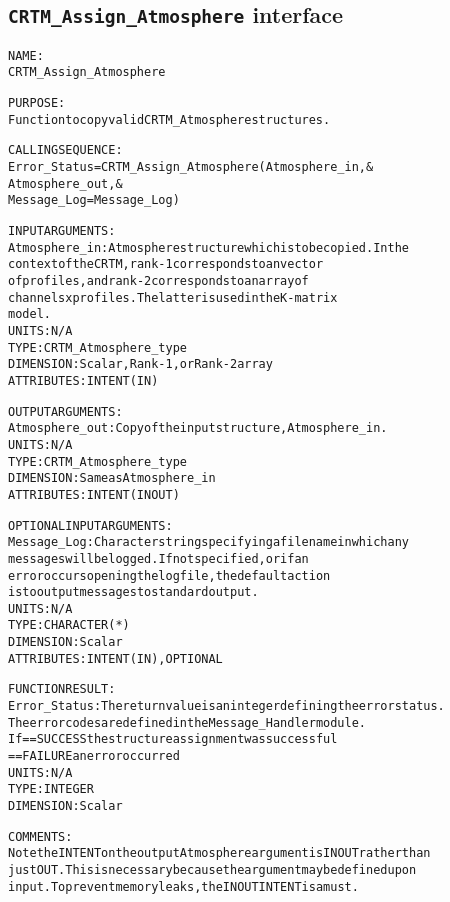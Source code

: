\subsection{\texttt{CRTM\_Assign\_Atmosphere} interface}
  \label{sec:CRTM_Assign_Atmosphere_interface}
  \begin{alltt}
 
  NAME:
        CRTM_Assign_Atmosphere
 
  PURPOSE:
        Function to copy valid CRTM_Atmosphere structures.
 
  CALLING SEQUENCE:
        Error_Status = CRTM_Assign_Atmosphere( Atmosphere_in          , &
                                               Atmosphere_out         , &
                                               Message_Log=Message_Log  )
 
  INPUT ARGUMENTS:
        Atmosphere_in:   Atmosphere structure which is to be copied. In the
                         context of the CRTM, rank-1 corresponds to an vector
                         of profiles, and rank-2 corresponds to an array of
                         channels x profiles. The latter is used in the K-matrix
                         model.
                         UNITS:      N/A
                         TYPE:       CRTM_Atmosphere_type
                         DIMENSION:  Scalar, Rank-1, or Rank-2 array
                         ATTRIBUTES: INTENT(IN)
 
  OUTPUT ARGUMENTS:
        Atmosphere_out:  Copy of the input structure, Atmosphere_in.
                         UNITS:      N/A
                         TYPE:       CRTM_Atmosphere_type
                         DIMENSION:  Same as Atmosphere_in
                         ATTRIBUTES: INTENT(IN OUT)
 
  OPTIONAL INPUT ARGUMENTS:
        Message_Log:     Character string specifying a filename in which any
                         messages will be logged. If not specified, or if an
                         error occurs opening the log file, the default action
                         is to output messages to standard output.
                         UNITS:      N/A
                         TYPE:       CHARACTER(*)
                         DIMENSION:  Scalar
                         ATTRIBUTES: INTENT(IN), OPTIONAL
 
  FUNCTION RESULT:
        Error_Status:    The return value is an integer defining the error status.
                         The error codes are defined in the Message_Handler module.
                         If == SUCCESS the structure assignment was successful
                            == FAILURE an error occurred
                         UNITS:      N/A
                         TYPE:       INTEGER
                         DIMENSION:  Scalar
 
  COMMENTS:
        Note the INTENT on the output Atmosphere argument is IN OUT rather than
        just OUT. This is necessary because the argument may be defined upon
        input. To prevent memory leaks, the IN OUT INTENT is a must.
 
  \end{alltt}
